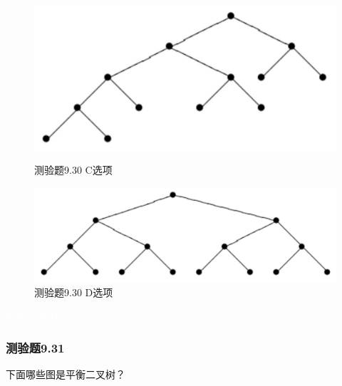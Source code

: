 \documentclass[UTF8, heading=true]{ctexart}
\begin{document}
\begin{figure}[H]
  \centering
  \begin{minipage}[t]{0.29\textwidth}
      \centering
      \includegraphics[width=1\textwidth]{9.30_3.jpg} %
      \vspace{-0.3cm}
      \caption{测验题9.30 C选项}
  \end{minipage}
  \hspace{0.2\textwidth} %
  \begin{minipage}[t]{0.34\textwidth}
      \centering
      \includegraphics[width=1\textwidth]{9.30_4.jpg} %
      \vspace{-0.3cm}
      \caption{测验题9.30 D选项}
\end{minipage}
\end{figure}

\textcolor{white}{答案：BCD}

\subsubsection{测验题9.31}

下面哪些图是平衡二叉树？
\end{document}
